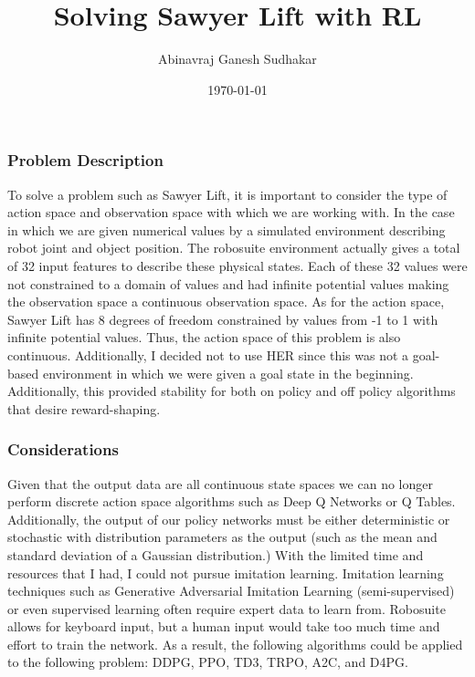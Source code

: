 \documentclass[8pt]{extarticle}
\begin{document}
\title{Solving Sawyer Lift with RL}
\author{Abinavraj Ganesh Sudhakar}
\date{\today}



\begin{adjmulticols}{2}{-1in}{-1in}
\maketitle

\subsubsection{Problem Description}
To solve a problem such as Sawyer Lift, it is important to consider the type of action space and observation space with which we are working with. In the case in which we are given numerical values by a simulated environment describing robot joint and object position. The robosuite environment actually gives a total of 32 input features to describe these physical states. Each of these 32 values were not constrained to a domain of values and had infinite potential values making the observation space a continuous observation space. As for the action space,  Sawyer Lift has 8 degrees of freedom constrained by values from -1 to 1 with infinite potential values. Thus, the action space of this problem is also continuous. Additionally, I decided not to use HER since this was not a goal-based environment in which we were given a goal state in the beginning. Additionally, this provided stability for both on policy and off policy algorithms that desire reward-shaping.

\subsubsection{Considerations}
Given that the output data are all continuous state spaces we can no longer perform discrete action space algorithms such as Deep Q Networks or Q Tables. Additionally, the output of our policy networks must be either deterministic or stochastic with distribution parameters as the output (such as the mean and standard deviation of a Gaussian distribution.) With the limited time and resources that I had, I could not pursue imitation learning. Imitation learning techniques such as Generative Adversarial Imitation Learning (semi-supervised) or even supervised learning often require expert data to learn from. Robosuite allows for keyboard input, but a human input would take too much time and effort to train the network. As a result, the following algorithms could be applied to the following problem: DDPG, PPO, TD3, TRPO, A2C, and D4PG.


\end{adjmulticols}
\end{document}
